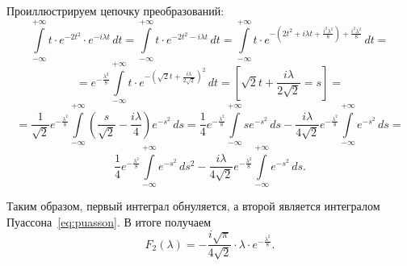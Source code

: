 \documentclass[a4paper, 11pt]{article}
\newcommand{\myint}[4]{\int\limits_{#1}^{#2}#3\,d#4}
\begin{document}
        Проиллюстрируем цепочку преобразований: 
        $$
            \myint{-\infty}{+\infty}{t \cdot e^{-2t^2} \cdot e^{-i\lambda  t}}{t} = \myint{-\infty}{+\infty}{t \cdot e^{-2t^2-i\lambda  t}}{t} =\myint{-\infty}{+\infty}{t \cdot e^{-\left(2t^2+i\lambda t+\frac{i^2\lambda^2}{8}\right)+\frac{i^2\lambda^2}{8}}}{t} = 
        $$
        $$
            = e^{-\frac{\lambda^2}{8}}\myint{-\infty}{+\infty}{t \cdot e^{-\left( \sqrt{2}t+\frac{i\lambda}{2\sqrt{2}}\right)^2}}{t}=\left[\sqrt{2}t+\frac{i\lambda}{2\sqrt{2}}=s\right]=
        $$
        $$
            =\frac{1}{\sqrt{2}}e^{-\frac{\lambda^2}{8}}\myint{-\infty}{+\infty}{\left(\frac{s}{\sqrt{2}}-\frac{i\lambda}{4}\right)e^{-s^2}}{s}=\frac{1}{4}e^{-\frac{\lambda^2}{8}}\myint{-\infty}{+\infty}{se^{-s^2}}{s} - \frac{i\lambda}{4\sqrt{2}}e^{-\frac{\lambda^2}{8}}\myint{-\infty}{+\infty}{e^{-s^2}}{s}=
        $$
        $$
            \frac{1}{4}e^{-\frac{\lambda^2}{8}}\myint{-\infty}{+\infty}{e^{-s^2}}{s^2} - \frac{i\lambda}{4\sqrt{2}}e^{-\frac{\lambda^2}{8}}\myint{-\infty}{+\infty}{e^{-s^2}}{s}.
        $$
        
        Таким образом, первый интеграл обнуляется, а второй является интегралом Пуассона~\eqref{eq:puasson}. В итоге получаем
        $$
            F_2(\lambda) = -\frac{i \sqrt{\pi}}{4\sqrt{2}} \cdot \lambda \cdot e^{-\frac{\lambda^2}{8}}.
        $$

\clearpage
\end{document}
